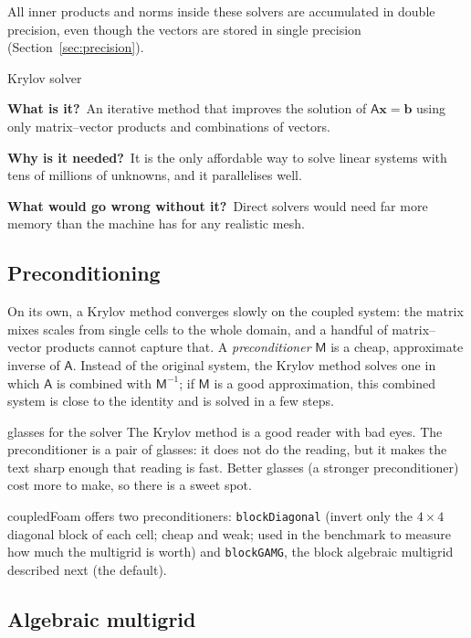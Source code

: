 \documentclass[11pt,a4paper]{article}
\newcommand{\vect}[1]{\mathbf{#1}}
\newcommand{\code}[1]{\texttt{#1}}
\newcommand{\bbwhat}{\par\smallskip\noindent\textbf{What is it?}\ }
\newcommand{\bbwhy}{\par\smallskip\noindent\textbf{Why is it needed?}\ }
\newcommand{\bbwithout}{\par\smallskip\noindent\textbf{What would go wrong
  without it?}\ }
\begin{document}
All inner products and norms inside these solvers are accumulated in double
precision, even though the vectors are stored in single precision
(Section~\ref{sec:precision}).

\begin{bblock}{Krylov solver}
\bbwhat An iterative method that improves the solution of
$\mathsf A\vect x=\vect b$ using only matrix--vector products and
combinations of vectors.
\bbwhy It is the only affordable way to solve linear systems with tens of
millions of unknowns, and it parallelises well.
\bbwithout Direct solvers would need far more memory than the machine has
for any realistic mesh.
\end{bblock}

\subsection{Preconditioning}\label{sec:precond}

On its own, a Krylov method converges slowly on the coupled system: the
matrix mixes scales from single cells to the whole domain, and a handful of
matrix--vector products cannot capture that. A \emph{preconditioner} $\mathsf M$
is a cheap, approximate inverse of $\mathsf A$. Instead of the original
system, the Krylov method solves one in which $\mathsf A$ is combined with
$\mathsf M^{-1}$; if $\mathsf M$ is a good approximation, this combined
system is close to the identity and is solved in a few steps.

\begin{intuition}{glasses for the solver}
  The Krylov method is a good reader with bad eyes. The preconditioner is a
  pair of glasses: it does not do the reading, but it makes the text sharp
  enough that reading is fast. Better glasses (a stronger preconditioner)
  cost more to make, so there is a sweet spot.
\end{intuition}

coupledFoam offers two preconditioners: \code{blockDiagonal} (invert only
the $4\times4$ diagonal block of each cell; cheap and weak; used in the
benchmark to measure how much the multigrid is worth) and \code{blockGAMG},
the block algebraic multigrid described next (the default).

\subsection{Algebraic multigrid}\label{sec:amg}
\end{document}
